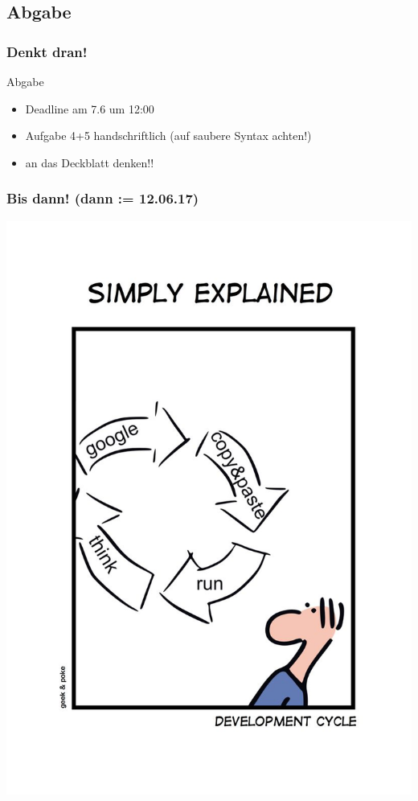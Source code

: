 \documentclass[18pt]{beamer}
\begin{document}
	\subsection{Abgabe}
	\begin{frame}
		\frametitle{Denkt dran!}
		\begin{alertblock}{Abgabe}
			\begin{itemize}
				\item Deadline am 7.6 um 12:00
				\item Aufgabe 4+5 handschriftlich (auf saubere Syntax achten!)
				\item an das Deckblatt denken!!
			\end{itemize}
		\end{alertblock}
	\end{frame}
		
	\begin{frame}
		\frametitle{Bis dann! (dann := 12.06.17)}
		\centering
		\includegraphics[scale=0.9]{./comics/geek_and_poke_development.jpg}
	\end{frame}
\end{document}

